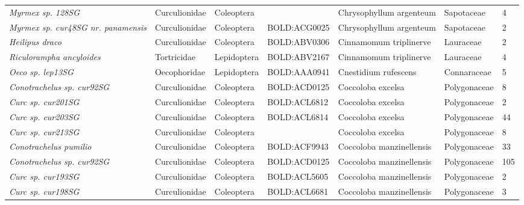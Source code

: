 \documentclass[11pt]{article}
\begin{document}
\begin{landscape}
\begin{longtable}{@{}lllllll@{}}
\textit{Myrmex sp. 128SG}                             & Curculionidae   & Coleoptera   &              & Chrysophyllum argenteum            & Sapotaceae       & 4     \\
\textit{Myrmex sp. cur48SG nr. panamensis}            & Curculionidae   & Coleoptera   & BOLD:ACG0025 & Chrysophyllum argenteum            & Sapotaceae       & 2     \\
\textit{Heilipus draco}                               & Curculionidae   & Coleoptera   & BOLD:ABV0306 & Cinnamomum triplinerve             & Lauraceae        & 2     \\
\textit{Riculorampha ancyloides}                      & Tortricidae     & Lepidoptera  & BOLD:ABV2167 & Cinnamomum triplinerve             & Lauraceae        & 4     \\
\textit{Oeco sp. lep13SG}                             & Oecophoridae    & Lepidoptera  & BOLD:AAA0941 & Cnestidium rufescens               & Connaraceae      & 5     \\
\textit{Conotrachelus sp. cur92SG}                    & Curculionidae   & Coleoptera   & BOLD:ACD0125 & Coccoloba excelsa                  & Polygonaceae     & 8     \\
\textit{Curc sp. cur201SG}                            & Curculionidae   & Coleoptera   & BOLD:ACL6812 & Coccoloba excelsa                  & Polygonaceae     & 2     \\
\textit{Curc sp. cur203SG}                            & Curculionidae   & Coleoptera   & BOLD:ACL6814 & Coccoloba excelsa                  & Polygonaceae     & 44    \\
\textit{Curc sp. cur213SG}                            & Curculionidae   & Coleoptera   &              & Coccoloba excelsa                  & Polygonaceae     & 8     \\
\textit{Conotrachelus pumilio}                        & Curculionidae   & Coleoptera   & BOLD:ACF9943 & Coccoloba manzinellensis           & Polygonaceae     & 33    \\
\textit{Conotrachelus sp. cur92SG}                    & Curculionidae   & Coleoptera   & BOLD:ACD0125 & Coccoloba manzinellensis           & Polygonaceae     & 105   \\
\textit{Curc sp. cur193SG}                            & Curculionidae   & Coleoptera   & BOLD:ACL5605 & Coccoloba manzinellensis           & Polygonaceae     & 2     \\
\textit{Curc sp. cur198SG}                            & Curculionidae   & Coleoptera   & BOLD:ACL6681 & Coccoloba manzinellensis           & Polygonaceae     & 3     \\

\end{longtable}
\end{landscape}
\end{document}
